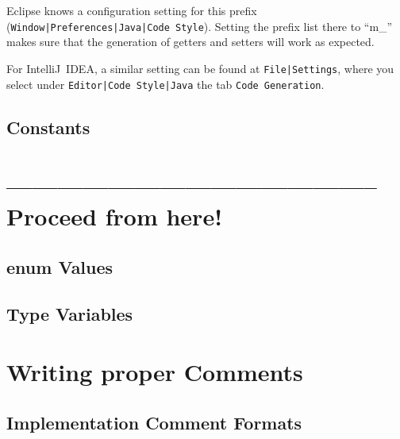 \documentclass[12pt,a4paper,titlepage, parskip=half, headsepline, footsepline, cleardoubleplain]{scrbook}
\begin{document}
Eclipse knows a configuration setting for this prefix (\verb#Window|Preferences|Java|Code Style#). Setting the prefix list there to “m\_” makes sure that the generation of getters and setters will work as expected.

For IntelliJ~IDEA, a similar setting can be found at \verb#File|Settings#, where you select under \verb#Editor|Code Style|Java# the tab \verb#Code Generation#.

\section{Constants}\label{sec:Constants}

\chapter{-------------------------------------------- Proceed from here!}






\section{enum Values}\label{sec:EnumValues}

\section{Type Variables}\label{sec:TypeVariables}

\chapter{Writing proper Comments}\label{sec:WritingProperComments}

\section{Implementation Comment Formats}
\end{document}
